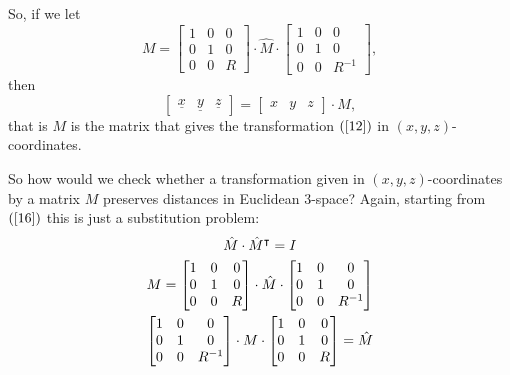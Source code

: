 \documentclass{ximera}
\begin{document}
So, if we let%
\[
M=\begin{bmatrix}
%
1 & 0 & 0\\
0 & 1 & 0\\
0 & 0 & R
\end{bmatrix}
  \cdot\hat{M}\cdot\begin{bmatrix}
%
1 & 0 & 0\\
0 & 1 & 0\\
0 & 0 & R^{-1}%
\end{bmatrix}
  ,
\]
then%
\begin{equation}
\begin{bmatrix}
%
\underline{x} & \underline{y} & \underline{z}%
\end{bmatrix}
  =\begin{bmatrix}
%
x & y & z
\end{bmatrix}
  \cdot M, \label{15}%
\end{equation}
that is $M$ is the matrix that gives the transformation $\left(
\ref{12}\right)  $ in $\left(  x,y,z\right)  $-coordinates.

So how would we check whether a transformation given in $\left(  x,y,z\right)
$-coordinates by a matrix $M$ preserves distances in Euclidean $3$-space?
Again, starting from $\left(  \ref{16}\right)  $ this is just a substitution
problem:%
\begin{gather*}
\hat{M}\cdot\hat{M}^\transpose=I\\
M=\begin{bmatrix}
%
1 & 0 & 0\\
0 & 1 & 0\\
0 & 0 & R
\end{bmatrix}
  \cdot\hat{M}\cdot\begin{bmatrix}
%
1 & 0 & 0\\
0 & 1 & 0\\
0 & 0 & R^{-1}%
\end{bmatrix}
 \\
\begin{bmatrix}
%
1 & 0 & 0\\
0 & 1 & 0\\
0 & 0 & R^{-1}%
\end{bmatrix}
  \cdot M\cdot\begin{bmatrix}
%
1 & 0 & 0\\
0 & 1 & 0\\
0 & 0 & R
\end{bmatrix}
  =\hat{M}%
\end{gather*}
\end{document}
